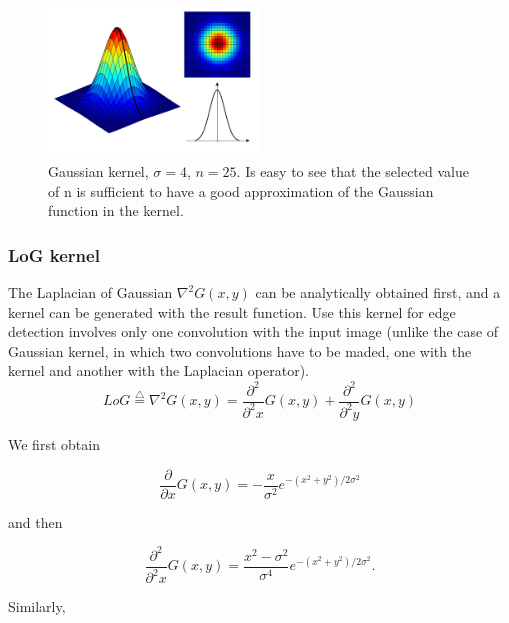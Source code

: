 \documentclass{ipol}
\numberwithin{equation}{section}
\numberwithin{table}{section}
\numberwithin{figure}{section}
\begin{document}
\begin{figure}
	\centering
	\includegraphics[width=0.5\textwidth]{kernel_gaussian.pdf}
	\caption{Gaussian kernel, $\sigma=4$, $n=25$. Is easy to see that the selected value of n is 
sufficient to have a good approximation of the Gaussian function in the kernel.}
	\label{fig:gaussian_kernel}
\end{figure}


\subsubsection{LoG kernel}

The Laplacian of Gaussian $\nabla^2G(x,y)$ can be analytically obtained first, and a kernel can be generated
with the result function. Use this kernel for edge detection involves only one convolution with 
the input image (unlike the case of Gaussian kernel, in which two convolutions have to be maded, one 
with the kernel and another with the Laplacian operator).\\

\begin{equation}
	LoG \stackrel{\triangle}{=}\nabla^2G(x,y)=\frac{\partial^2}{\partial^2 x}G(x,y) + \frac{\partial^2}{\partial^2 y}G(x,y)
\end{equation}

We first obtain

\begin{equation} 
	\frac{\partial}{\partial x}G(x,y)=-\frac{x}{\sigma^2}e^{-(x^2+y^2)/2\sigma^2}
\end{equation}

and then

\begin{equation} 
	\frac{\partial^2}{\partial^2 x}G(x,y)=\frac{x^2-\sigma^2}{\sigma^4}e^{-(x^2+y^2)/2\sigma^2}.
\end{equation}

Similarly,
\end{document}
